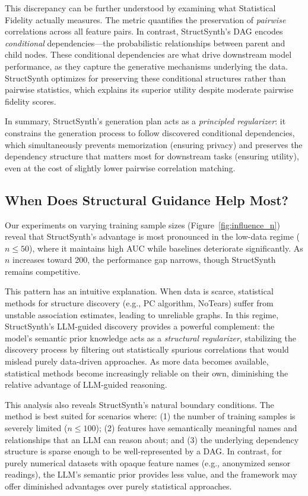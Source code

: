This discrepancy can be further understood by examining what Statistical Fidelity actually measures. The metric quantifies the preservation of \emph{pairwise} correlations across all feature pairs. In contrast, StructSynth's DAG encodes \emph{conditional} dependencies---the probabilistic relationships between parent and child nodes. These conditional dependencies are what drive downstream model performance, as they capture the generative mechanisms underlying the data. StructSynth optimizes for preserving these conditional structures rather than pairwise statistics, which explains its superior utility despite moderate pairwise fidelity scores.

In summary, StructSynth's generation plan acts as a \emph{principled regularizer}: it constrains the generation process to follow discovered conditional dependencies, which simultaneously prevents memorization (ensuring privacy) and preserves the dependency structure that matters most for downstream tasks (ensuring utility), even at the cost of slightly lower pairwise correlation matching.

\subsection{When Does Structural Guidance Help Most?}
\label{sec:when_helps}
Our experiments on varying training sample sizes (Figure~\ref{fig:influence_n}) reveal that StructSynth's advantage is most pronounced in the low-data regime ($n \leq 50$), where it maintains high AUC while baselines deteriorate significantly. As $n$ increases toward 200, the performance gap narrows, though StructSynth remains competitive.

This pattern has an intuitive explanation. When data is scarce, statistical methods for structure discovery (e.g., PC algorithm, NoTears) suffer from unstable association estimates, leading to unreliable graphs. In this regime, StructSynth's LLM-guided discovery provides a powerful complement: the model's semantic prior knowledge acts as a \emph{structural regularizer}, stabilizing the discovery process by filtering out statistically spurious correlations that would mislead purely data-driven approaches. As more data becomes available, statistical methods become increasingly reliable on their own, diminishing the relative advantage of LLM-guided reasoning.

This analysis also reveals StructSynth's natural boundary conditions. The method is best suited for scenarios where: (1) the number of training samples is severely limited ($n \leq 100$); (2) features have semantically meaningful names and relationships that an LLM can reason about; and (3) the underlying dependency structure is sparse enough to be well-represented by a DAG. In contrast, for purely numerical datasets with opaque feature names (e.g., anonymized sensor readings), the LLM's semantic prior provides less value, and the framework may offer diminished advantages over purely statistical approaches.


